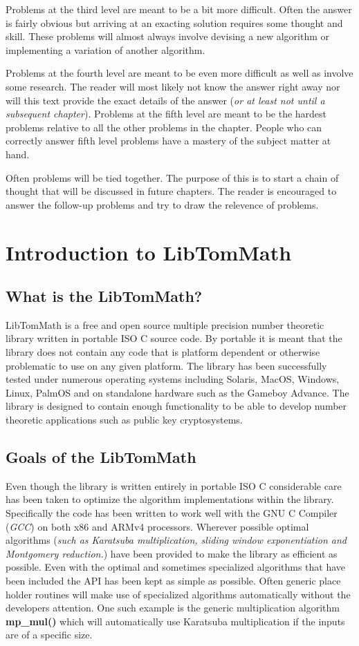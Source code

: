 \documentclass[b5paper]{book}
\begin{document}
Problems at the third level are meant to be a bit more difficult.  Often the answer is fairly obvious but arriving at an exacting solution
requires some thought and skill.  These problems will almost always involve devising a new algorithm or implementing a variation of
another algorithm.

Problems at the fourth level are meant to be even more difficult as well as involve some research.  The reader will most likely not know
the answer right away nor will this text provide the exact details of the answer (\textit{or at least not until a subsequent chapter}).  Problems
at the fifth level are meant to be the hardest problems relative to all the other problems in the chapter.  People who can correctly 
answer fifth level problems have a mastery of the subject matter at hand.

Often problems will be tied together.  The purpose of this is to start a chain of thought that will be discussed in future chapters.  The reader
is encouraged to answer the follow-up problems and try to draw the relevence of problems.

\chapter{Introduction to LibTomMath}

\section{What is the LibTomMath?}
LibTomMath is a free and open source multiple precision number theoretic library written in portable ISO C
source code.  By portable it is meant that the library does not contain any code that is platform dependent or otherwise
problematic to use on any given platform.  The library has been successfully tested under numerous operating systems 
including Solaris, MacOS, Windows, Linux, PalmOS and on standalone hardware such as the Gameboy Advance.  The 
library is designed to contain enough functionality to be able to develop number theoretic applications such as public 
key cryptosystems.

\section{Goals of the LibTomMath}

Even though the library is written entirely in portable ISO C considerable care has been taken to 
optimize the algorithm implementations within the library.  Specifically the code has been written to work well with
the GNU C Compiler (\textit{GCC}) on both x86 and ARMv4 processors.  Wherever possible optimal 
algorithms (\textit{such as Karatsuba multiplication, sliding window exponentiation and Montgomery reduction.}) have 
been provided to make the library as efficient as possible.  Even with the optimal and sometimes specialized 
algorithms that have been included the API has been kept as simple as possible.  Often generic place holder routines 
will make use of specialized algorithms automatically without the developers attention.  One such example
is the generic multiplication algorithm \textbf{mp\_mul()} which will automatically use Karatsuba multiplication if the 
inputs are of a specific size.
\end{document}
